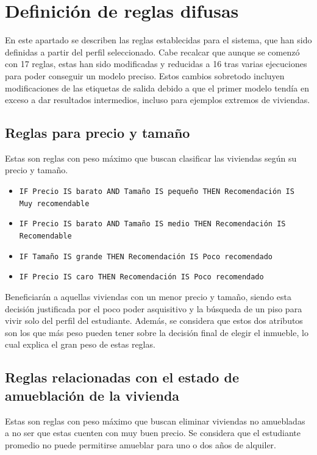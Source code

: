 \documentclass[12pt]{report} %
\begin{document}
    \section{Definición de reglas difusas}

    En este apartado se describen las reglas establecidas para el sistema, que
    han sido definidas a partir del perfil seleccionado. Cabe recalcar que
    aunque se comenzó con 17 reglas, estas han sido modificadas y reducidas a
    16 tras varias ejecuciones para poder conseguir un modelo preciso. Estos
    cambios sobretodo incluyen modificaciones de las etiquetas de salida
    debido a que el primer modelo tendía en exceso a dar resultados intermedios,
    incluso para ejemplos extremos de viviendas.

    \subsection{Reglas para precio y tamaño}
    Estas son reglas con peso máximo que buscan clasificar las viviendas según su precio y tamaño.

    \begin{itemize}
        \item \texttt{IF Precio IS barato AND Tamaño IS pequeño THEN Recomendación IS\\Muy recomendable}
        \item \texttt{IF Precio IS barato AND Tamaño IS medio THEN Recomendación IS\\Recomendable}
        \item \texttt{IF Tamaño IS grande THEN Recomendación IS Poco recomendado}
        \item \texttt{IF Precio IS caro THEN Recomendación IS Poco recomendado}
    \end{itemize}

    Beneficiarán a aquellas viviendas con un menor precio y tamaño, siendo 
    esta decisión justificada por el poco poder asquisitivo y la búsqueda de un piso para vivir solo
    del perfil del estudiante. Además, se considera que estos dos atributos son los que más peso 
    pueden tener sobre la decisión final de elegir el inmueble, lo cual explica el gran peso de 
    estas reglas.

    \subsection{Reglas relacionadas con el estado de amueblación de la vivienda}
    Estas son reglas con peso máximo que buscan eliminar viviendas no amuebladas a no 
    ser que estas cuenten con muy buen precio. Se considera que el estudiante 
    promedio no puede permitirse amueblar para uno o dos años de alquiler.
\end{document}
